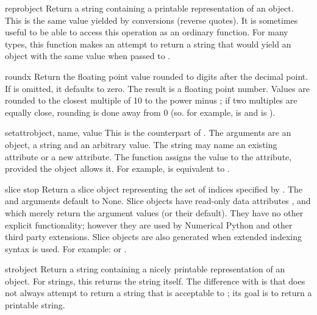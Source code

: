 \begin{funcdesc}{repr}{object}
  Return a string containing a printable representation of an object.
  This is the same value yielded by conversions (reverse quotes).
  It is sometimes useful to be able to access this operation as an
  ordinary function.  For many types, this function makes an attempt
  to return a string that would yield an object with the same value
  when passed to .
\end{funcdesc}

\begin{funcdesc}{round}{x}
  Return the floating point value  rounded to  digits
  after the decimal point.  If  is omitted, it defaults to zero.
  The result is a floating point number.  Values are rounded to the
  closest multiple of 10 to the power minus ; if two multiples
  are equally close, rounding is done away from 0 (so. for example,
   is  and  is ).
\end{funcdesc}

\begin{funcdesc}{setattr}{object, name, value}
  This is the counterpart of .  The arguments are an
  object, a string and an arbitrary value.  The string may name an
  existing attribute or a new attribute.  The function assigns the
  value to the attribute, provided the object allows it.  For example,
   is equivalent to
  .
\end{funcdesc}

\begin{funcdesc}{slice}{ stop}
  Return a slice object representing the set of indices specified by
  .  The 
  and  arguments default to None.  Slice objects have
  read-only data attributes ,  and
   which merely return the argument values (or their
  default).  They have no other explicit functionality; however they
  are used by Numerical Python and other third
  party extensions.  Slice objects are also generated when extended
  indexing syntax is used.  For example:  or
  .
\end{funcdesc}

\begin{funcdesc}{str}{object}
  Return a string containing a nicely printable representation of an
  object.  For strings, this returns the string itself.  The
  difference with  is that
   does not always attempt to return a string
  that is acceptable to ; its goal is to return a
  printable string.
\end{funcdesc}

